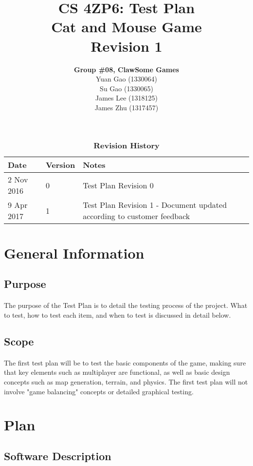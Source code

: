 \documentclass[12pt, titlepage]{article}
\title{CS 4ZP6: Test Plan
\\Cat and Mouse Game
\\Revision 1}
\author{\textbf{Group \#08, ClawSome Games}
		\\ Yuan Gao (1330064)
		\\ Su Gao (1330065)
		\\ James Lee (1318125)
		\\ James Zhu (1317457) 
}
\date{\displaydate{date}}
\begin{document}
\maketitle
{}
\tableofcontents
\listoftables
\listoffigures
\begin{table}[bp]
\caption{\bf Revision History}
\begin{tabularx}{\textwidth}{p{3cm}p{2cm}X}
\toprule {\bf Date} & {\bf Version} & {\bf Notes}\\
\midrule
2 Nov 2016 & 0 & Test Plan Revision 0\\
\midrule
9 Apr 2017 & 1 & Test Plan Revision 1 - Document updated according to customer feedback\\
\bottomrule
\end{tabularx}
\end{table}
\newpage
{}
\section{General Information}
\subsection{Purpose}
\paragraph{}The purpose of the Test Plan is to detail the testing process of the project. What to test, how to test each item, and when to test is discussed in detail below. 
\subsection{Scope}
\paragraph{}The first test plan will be to test the basic components of the game, making sure that key elements such as multiplayer are functional, as well as basic design concepts such as map generation, terrain, and physics. The first test plan will not involve "game balancing" concepts or detailed graphical testing. 

\section{Plan}
	
\subsection{Software Description}
\end{document}
